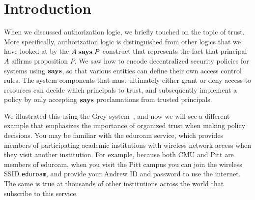 \documentclass[11pt]{article}
\begin{document}
\maketitle

\section{Introduction}

When we discussed authorization logic, we briefly touched on the topic
of trust. More specifically, authorization logic is distinguished from
other logics that we have looked at by the $A \mathrel{\mathbf{says}} P$
construct that represents the fact that principal $A$ affirms
proposition $P$. We saw how to encode decentralized
security policies for systems using $\mathbf{says}$, so that
various entities can define their own access control rules. The system
components that must ultimately either grant or deny access to
resources can decide which principals to trust, and subsequently
implement a policy by only accepting $\mathbf{says}$ proclamations
from trusted principals.

We illustrated this using the Grey system~\cite{Bauer05isc}, and now we
will see a different example that emphasizes the importance of
organized trust when making policy decisions. You may be familiar with
the eduroam service, which provides members of participating academic
institutions with wireless network access when they visit another
institution. For example, because both CMU and Pitt are members of
eduroam, when you visit the Pitt campus you can join the wireless SSID
\verb'eduroam', and provide your Andrew ID and password to use the
internet. The same is true at thousands of other institutions across
the world that subscribe to this service.
\end{document}
